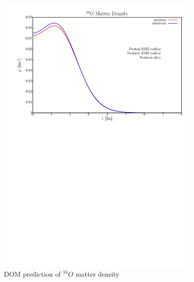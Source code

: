 \begin{figure}
\begin{center}
\includegraphics[width = 0.9\textwidth]{figures/o16_matterDensity.png}
\caption{DOM prediction of $^{16}O$ matter density}
\label{o16MatterDensity}
\end{center}
\end{figure}


\afterpage{\clearpage}
